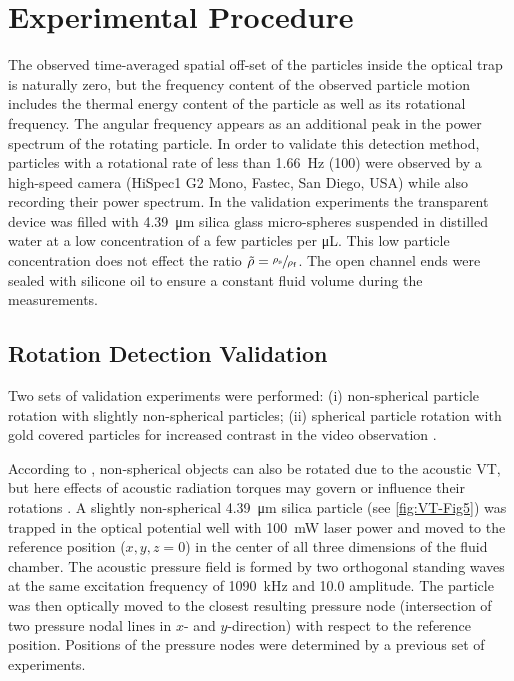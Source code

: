 \section{Experimental Procedure\label{sec:VT-experimentalProcedure}}

The observed time-averaged spatial off-set of the particles inside the optical 
trap is naturally zero, but the frequency content of the observed particle 
motion includes the thermal energy content of the particle as well as its 
rotational frequency. The angular frequency appears as an additional peak in the 
power spectrum of the rotating particle. In order to validate this detection 
method, particles with a rotational rate of less than \SI{1.66}{\hertz} 
(\SI{100}{\rpm}) were observed by a high-speed camera (HiSpec1 G2 Mono, Fastec, 
San Diego, USA) while also recording their power spectrum.  In the validation 
experiments the transparent device was filled with \SI{4.39}{\micro\meter} 
silica glass micro-spheres suspended in distilled water at a low concentration 
of a few particles per \si{\micro\liter}.  This low particle concentration does 
not effect the ratio $\tilde{\rho} = \sfrac{\rho_{\text{s}}}{\rho_{\text{f}}}$. 
The open channel ends were sealed with silicone oil to ensure a constant fluid 
volume during the measurements.

\subsection{Rotation Detection 
Validation\label{sec:VT-rotationDetectionValidation}}

Two sets of validation experiments were performed: (i) non-spherical particle 
rotation with slightly non-spherical particles; (ii) spherical particle rotation 
with gold covered particles for increased contrast in the video observation 
\cite{Lamprecht2013}. 

According to \citeauthor{Hahn2016} \cite{Hahn2016}, non-spherical objects can 
also be rotated due to the acoustic VT, but here effects of acoustic radiation 
torques may govern or influence their rotations \cite{Wang2012}. A slightly 
non-spherical \SI{4.39}{\micro\meter} silica particle (see \cref{fig:VT-Fig5}) was 
trapped in the optical potential well with \SI{100}{\milli\watt} laser power and 
moved to the reference position ($x,y,z = 0$) in the center of all three 
dimensions of the fluid chamber. The acoustic pressure field is formed by two 
orthogonal standing waves at the same excitation frequency of 
\SI{1090}{\kilo\hertz} and \SI{10.0}{\Vrms} amplitude. The particle was then 
optically moved to the closest resulting pressure node (intersection of two 
pressure nodal lines in $x$- and $y$-direction) with respect to the reference 
position. Positions of the pressure nodes were determined by a previous set of 
experiments.

